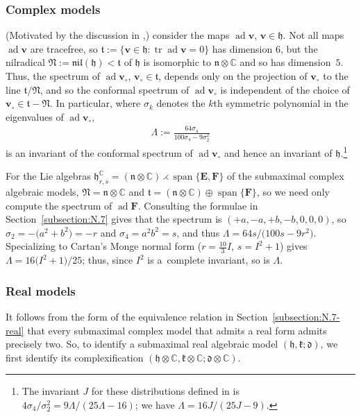 \documentclass[10pt,a4paper]{amsart}
\DeclareMathOperator{\ad} {ad}
\DeclareMathOperator{\spanOperator}{span}
\DeclareMathOperator{\tr} {tr}
\newcommand{\Span}[1]{\spanOperator\{{#1}\}}
\newcommand{\bbC}{\mathbb{C}}
\newcommand{\mbE}{\mathbf{E}}
\newcommand{\mbF}{\mathbf{F}}
\newcommand{\mbv}{\mathbf{v}}
\newcommand{\mfd} {\mathfrak{d}}
\newcommand{\mfh} {\mathfrak{h}}
\newcommand{\mfk} {\mathfrak{k}}
\newcommand{\mfN} {\mathfrak{N}}
\newcommand{\mfn} {\mathfrak{n}}
\newcommand{\mft} {\mathfrak{t}}
\newcommand{\mfnil}{\mathfrak{nil}}
\numberwithin{equation}{section}
\begin{document}
\subsubsection{Complex models}\label{subsubsection:identification-submaximal-complex}
(Motivated by the discussion in \cite[Section~2]{DoubrovKruglikov},) consider the maps $\ad \mbv$, $\mbv \in \mfh$. Not all maps $\ad \mbv$ are tracefree, so $\mft := \{ \mbv \in \mfh \colon \tr \ad \mbv = 0 \}$ has dimension $6$, but the nilradical $\mfN := \mfnil(\mfh) < \mft$ of $\mfh$ is isomorphic to $\mfn \otimes \bbC$ and so has dimension~$5$. Thus, the spectrum of $\ad \mbv_{\circ}$, $\mbv_{\circ} \in \mft$, depends only on the projection of $\mbv_{\circ}$ to the line $\mft / \mfN$, and so the conformal spectrum of $\ad \mbv_{\circ}$ is independent of the choice of $\mbv_{\circ} \in \mft - \mfN$. In particular, where $\sigma_k$ denotes the $k$th symmetric polynomial in the eigenvalues of $\ad \mbv_{\circ}$,
\begin{gather*}
	\boxed{\Lambda := \frac{64 \sigma_4}{100 \sigma_4 - 9 \sigma_2^2}}
\end{gather*}
is an invariant of the conformal spectrum of $\ad \mbv_{\circ}$ and hence an invariant of $\mfh$.\footnote{The invariant $J$ for these distributions defined in \cite{DoubrovKruglikov} is $4 \sigma_4 / \sigma_2^2 = 9 \Lambda / (25 \Lambda - 16)$; we have $\Lambda = 16 J / (25 J - 9)$.}

For the Lie algebras $\mfh_{r, s}^{\bbC} = (\mfn \otimes \bbC) \rightthreetimes \Span{\mbE, \mbF}$ of the submaximal complex algebraic models, $\mfN = \mfn \otimes \bbC$ and $\mft = (\mfn \otimes \bbC) \oplus \Span{\mbF}$, so we need only compute the spectrum of $\ad \mbF$. Consulting the formulae in Section~\ref{subsection:N.7} gives that the spectrum is $(+a, -a, +b, -b, 0, 0, 0)$, so $\sigma_2 = -\big(a^2 + b^2\big) = -r$ and $\sigma_4 = a^2 b^2 = s$, and thus $\Lambda = 64 s / \big(100 s - 9 r^2\big)$. Specializing to Cartan's Monge normal form ($r = \frac{10}{3} I$, $s = I^2 + 1$) gives $\Lambda = 16 \big(I^2 + 1\big) / 25$; thus, since $I^2$ is a~complete invariant, so is $\Lambda$.

\subsubsection{Real models}\label{subsubsection:identification-submaximal-real}

It follows from the form of the equivalence relation in Section~\ref{subsection:N.7-real} that every submaximal complex model that admits a real form admits precisely two. So, to identify a submaximal real algebraic model $(\mfh, \mfk; \mfd)$, we first identify its complexification $(\mfh \otimes \bbC, \mfk \otimes \bbC; \mfd \otimes \bbC)$.
\end{document}
